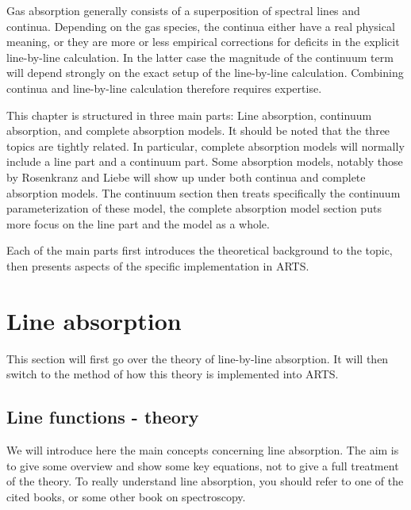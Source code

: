 Gas absorption generally consists of a superposition of spectral lines
and continua.  Depending on the gas species, the continua either have
a real physical meaning, or they are more or less empirical
corrections for deficits in the explicit line-by-line calculation.  In
the latter case the magnitude of the continuum term will depend
strongly on the exact setup of the line-by-line calculation.
Combining continua and line-by-line calculation therefore requires
expertise.

This chapter is structured in three main parts: Line absorption,
continuum absorption, and complete absorption models. It should be
noted that the three topics are tightly related. In particular,
complete absorption models will normally include a line part and a
continuum part. Some absorption models, notably those by Rosenkranz
and Liebe will show up under both continua and complete absorption
models. The continuum section then treats specifically the continuum
parameterization of these model, the complete absorption model section
puts more focus on the line part and the model as a whole.

Each of the main parts first introduces the theoretical background to the topic,
then presents aspects of the specific implementation in ARTS.
                                          


\section{Line absorption}
\label{sec:abs_theory:line_absorption}

This section will first go over the theory of line-by-line absorption.
It will then switch to the method of how this theory is implemented into ARTS.

\subsection{Line functions - theory}
 
We will introduce here the main concepts concerning line
absorption. The aim is to give some overview and show some key
equations, not to give a full treatment of the theory. To really
understand line absorption, you should refer to one of the cited
books, or some other book on spectroscopy. 

